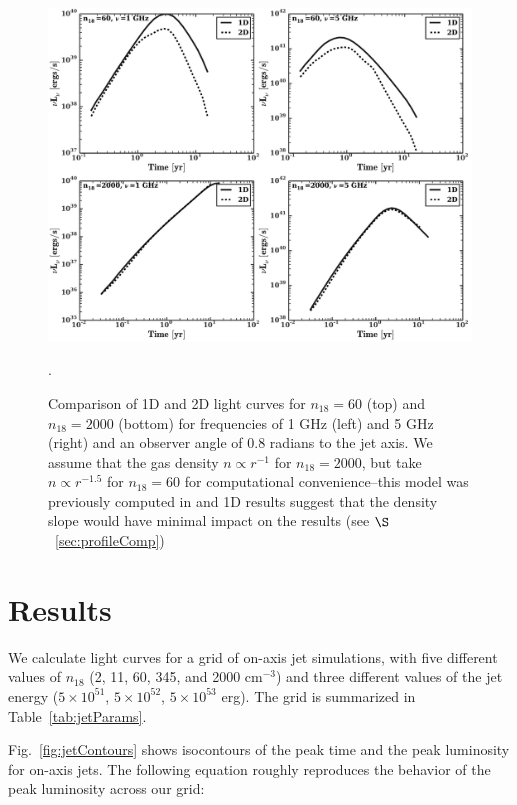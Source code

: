 \documentclass[usenatbib,fleqn]{mnras}
\begin{document}
\begin{figure}
\includegraphics[width=16cm]{1D_2D.pdf}
\caption{\label{fig:1D2DB} Comparison of 1D and 2D light curves for
  $n_{18}=60$ (top) and $n_{18}=2000$ (bottom) for frequencies of 1
  GHz (left) and 5 GHz (right) and an observer angle of 0.8 radians to
  the jet axis. We assume that the gas density $n\propto r^{-1}$ for
  $n_{18}=2000$, but take $n\propto r^{-1.5}$ for $n_{18}=60$ for
  computational convenience--this model was previously computed in
  \citet{Mimica+2015} and 1D results suggest that the density slope
  would have minimal impact on the results (see
  $\S$~\ref{sec:profileComp})}.
\end{figure}

\section{Results}
\label{sec:results}
We calculate light curves for a grid of on-axis jet simulations, with
five different values of $n_{18}$ (2, 11, 60, 345, and 2000 cm$^{-3}$)
and three different values of the jet energy ($5\times 10^{51}$,
$5\times 10^{52}$, $5\times 10^{53}$ erg). The grid is summarized in
Table~\ref{tab:jetParams}.


Fig.~\ref{fig:jetContours} shows isocontours of the peak time and the
peak luminosity for on-axis jets. The following equation roughly
reproduces the behavior of the peak luminosity across our grid:
\end{document}
